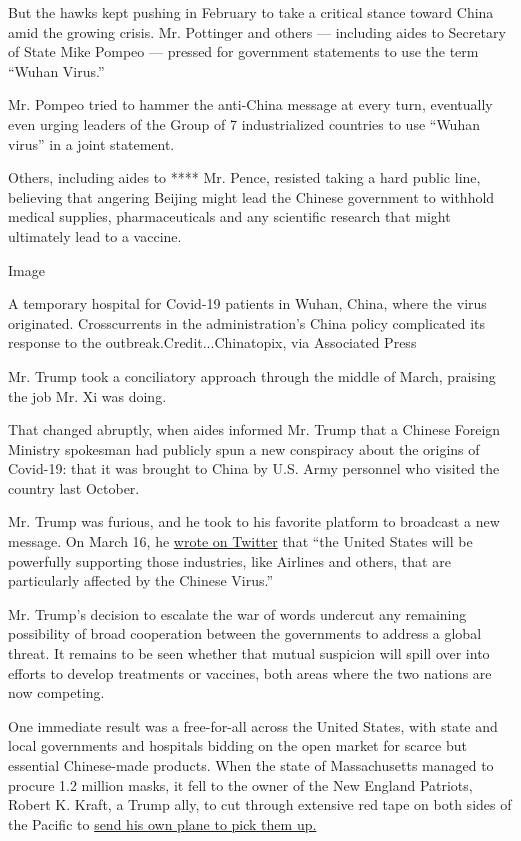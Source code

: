 But the hawks kept pushing in February to take a critical stance toward
China amid the growing crisis. Mr. Pottinger and others --- including
aides to Secretary of State Mike Pompeo --- pressed for government
statements to use the term ``Wuhan Virus.''

Mr. Pompeo tried to hammer the anti-China message at every turn,
eventually even urging leaders of the Group of 7 industrialized
countries to use ``Wuhan virus'' in a joint statement.

Others, including aides to **** Mr. Pence, resisted taking a hard public
line, believing that angering Beijing might lead the Chinese government
to withhold medical supplies, pharmaceuticals and any scientific
research that might ultimately lead to a vaccine.

Image

A temporary hospital for Covid-19 patients in Wuhan, China, where the
virus originated. Crosscurrents in the administration's China policy
complicated its response to the outbreak.Credit...Chinatopix, via
Associated Press

Mr. Trump took a conciliatory approach through the middle of March,
praising the job Mr. Xi was doing.

That changed abruptly, when aides informed Mr. Trump that a Chinese
Foreign Ministry spokesman had publicly spun a new conspiracy about the
origins of Covid-19: that it was brought to China by U.S. Army personnel
who visited the country last October.

Mr. Trump was furious, and he took to his favorite platform to broadcast
a new message. On March 16, he
\href{https://twitter.com/realDonaldTrump/status/1239685852093169664?ref_src=twsrc\%5Etfw\%7Ctwcamp\%5Etweetembed\%7Ctwterm\%5E1239685852093169664\&ref_url=https\%3A\%2F\%2Fwww.bloomberg.com\%2Fnews\%2Farticles\%2F2020-03-17\%2Ftrump-s-chinese-virus-tweet-adds-fuel-to-fire-with-beijing}{wrote
on Twitter} that ``the United States will be powerfully supporting those
industries, like Airlines and others, that are particularly affected by
the Chinese Virus.''

Mr. Trump's decision to escalate the war of words undercut any remaining
possibility of broad cooperation between the governments to address a
global threat. It remains to be seen whether that mutual suspicion will
spill over into efforts to develop treatments or vaccines, both areas
where the two nations are now competing.

One immediate result was a free-for-all across the United States, with
state and local governments and hospitals bidding on the open market for
scarce but essential Chinese-made products. When the state of
Massachusetts managed to procure 1.2 million masks, it fell to the owner
of the New England Patriots, Robert K. Kraft, a Trump ally, to cut
through extensive red tape on both sides of the Pacific to
\href{https://www.nytimes3xbfgragh.onion/aponline/2020/04/02/sports/football/ap-fbn-patriots-masks-assist.html}{send
his own plane to pick them up.}

